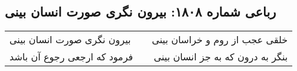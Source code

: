 \begin{center}
\section*{رباعی شماره ۱۸۰۸: بیرون نگری صورت انسان بینی}
\label{sec:1808}
\begin{longtable}{l p{0.5cm} r}
بیرون نگری صورت انسان بینی
&&
خلقی عجب از روم و خراسان بینی
\\
فرمود که ارجعی رجوع آن باشد
&&
بنگر به درون که به جز انسان بینی
\\
\end{longtable}
\end{center}

